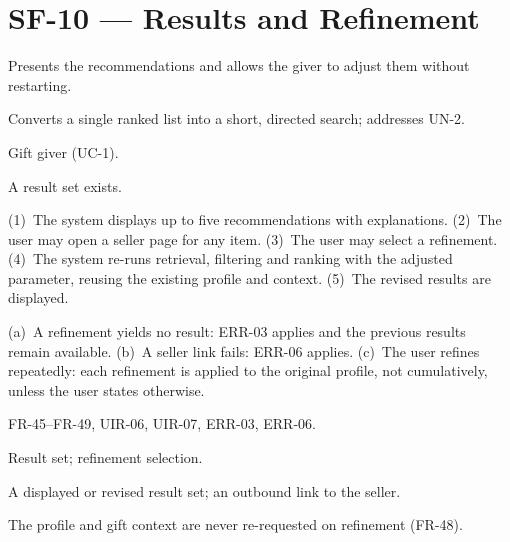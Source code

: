 \documentclass[11pt,a4paper]{report}
\begin{document}
\section{SF-10 --- Results and Refinement}
\begin{description}[style=nextline,leftmargin=0pt]
\item[Description] Presents the recommendations and allows the giver to adjust them without restarting.
\item[Purpose] Converts a single ranked list into a short, directed search; addresses UN-2.
\item[Actors] Gift giver (UC-1).
\item[Preconditions] A result set exists.
\item[Main flow] (1)~The system displays up to five recommendations with explanations. (2)~The user may open a seller page for any item. (3)~The user may select a refinement. (4)~The system re-runs retrieval, filtering and ranking with the adjusted parameter, reusing the existing profile and context. (5)~The revised results are displayed.
\item[Alternative and exception flows] (a)~A refinement yields no result: ERR-03 applies and the previous results remain available. (b)~A seller link fails: ERR-06 applies. (c)~The user refines repeatedly: each refinement is applied to the original profile, not cumulatively, unless the user states otherwise.
\item[Requirements] FR-45--FR-49, UIR-06, UIR-07, ERR-03, ERR-06.
\item[Inputs] Result set; refinement selection.
\item[Outputs] A displayed or revised result set; an outbound link to the seller.
\item[Constraints] The profile and gift context are never re-requested on refinement (FR-48).
\end{description}
\end{document}
